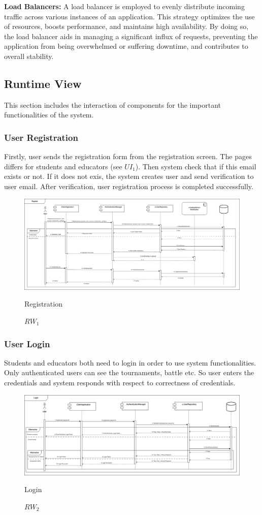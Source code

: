 \indent \textbf{Load Balancers:} A load balancer is employed to evenly distribute incoming traffic across various instances of an application. This strategy optimizes the use of resources, boosts performance, and maintains high availability. By doing so, the load balancer aids in managing a significant influx of requests, preventing the application from being overwhelmed or suffering downtime, and contributes to overall stability.


\newpage
\subsection{Runtime View}
This section includes the interaction of components for the important functionalities of the system. 
\subsubsection{User Registration}
Firstly, user sends the registration form from the registration screen. The pages differs for students and educators (see $UI_{1}$). Then system check that if this email exists or not. If it does not exis, the system creates user and send verification to user email. After verification, user registration process is completed successfully.
\begin{figure}[H]
    \centering
    \includegraphics[width=\linewidth]{Images/runtime/register_runtime.drawio.png}
    \caption{$RW_{1}$} Registration
\end{figure}

\subsubsection{User Login}
Students and educators both need to login in order to use system functionalities. Only authenticated users can see the tournaments, battle etc. So user enters the credentials and system responds with respect to correctness of credentials.
\begin{figure}[H]
    \centering
    \includegraphics[width=\linewidth]{Images/runtime/login_runtime.drawio.png}
    \caption{$RW_{2}$} Login
\end{figure}

